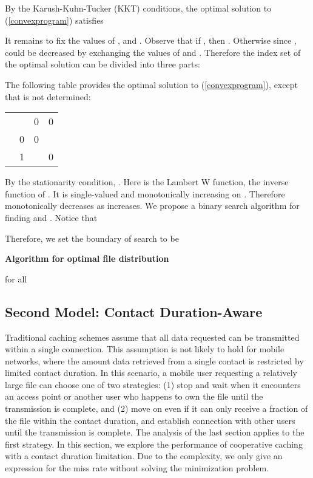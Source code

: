\documentclass{sig-alternate}
\begin{document}
By the Karush-Kuhn-Tucker (KKT) conditions, the optimal solution  to (\ref{convexprogram}) satisfies



It remains to fix the values of ,  and . Observe that if , then . Otherwise since ,  could be decreased by exchanging the values of  and . Therefore the index set of the optimal solution  can be divided into three parts: 



The following table provides the optimal solution to (\ref{convexprogram}), except that  is not determined:

\begin{center}
    \begin{tabular}{ | l | l | p{2cm} | p{2cm} |}
    \hline
     &  &  &  \\ \hline
     &  & 0 & 0 \\ \hline
     & 0 & 0 &  \\ \hline
     & 1 &  & 0 \\ \hline
    \end{tabular}
\end{center}

By the stationarity condition, . Here  is the Lambert W function, the inverse function of . It is single-valued and monotonically increasing on . Therefore  monotonically decreases as  increases. We propose a binary search algorithm for finding  and . Notice that 

Therefore, we set the boundary of search to be \newline 


\vspace{5mm}
	\textbf{Algorithm for optimal file distribution}

	\begin{algorithmic}
	\STATE  for all 
	\STATE 
	\STATE 
	\WHILE {}
		\STATE 
			\STATE 
		\ENDFOR
		\IF {}
			\STATE 
		\ELSE
			\STATE 
		\ENDIF
	\ENDWHILE
	\end{algorithmic}


\subsection{Second Model: Contact Duration-Aware}

Traditional caching schemes assume that all data requested can be transmitted within a single connection. This assumption is not likely to hold for mobile networks, where the amount data retrieved from a single contact is restricted by limited contact duration. In this scenario, a mobile user requesting a relatively large file can choose one of two strategies: (1) stop and wait when it encounters an access point or another user who happens to own the file until the transmission is complete, and (2) move on even if it can only receive a fraction of the file within the contact duration, and establish connection with other users until the transmission is complete. The analysis of the last section applies to the first strategy. In this section, we explore the performance of cooperative caching with a contact duration limitation. Due to the complexity, we only give an expression for the miss rate without solving the minimization problem. 
\end{document}
